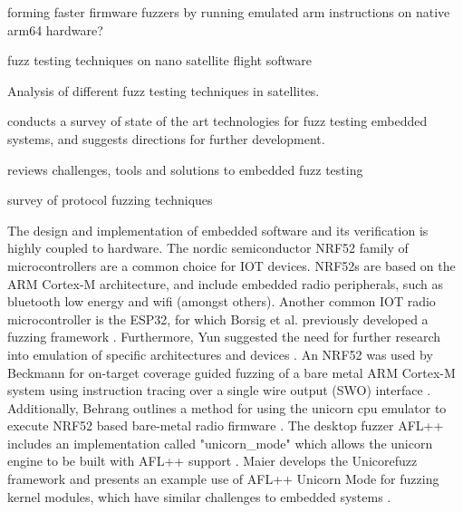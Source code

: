 \documentclass[../report.tex]{subfiles}
\begin{document}
\citet{Seidel_2023} forming faster firmware fuzzers by running emulated arm instructions on native arm64 hardware?


\citet{Gutierrez_2021} fuzz testing techniques on nano satellite flight software

\citet{Willbold_2024} Analysis of different fuzz testing techniques in satellites.



\citet{Yun_2022} conducts a survey of state of the art technologies for fuzz testing embedded systems, and suggests directions for further development.

\citet{Eisele_et_al_2022} reviews challenges, tools and solutions to embedded fuzz testing


\citet{Zhang_2024} survey of protocol fuzzing techniques




The design and implementation of embedded software and its verification is
highly coupled to hardware. The nordic semiconductor NRF52 family of
microcontrollers are a common choice for IOT devices. NRF52s are based on the
ARM Cortex-M architecture, and include embedded radio peripherals, such as
bluetooth low energy and wifi (amongst others). Another common IOT radio
microcontroller is the ESP32, for which Borsig et al. previously developed a
fuzzing framework \citep{Borsig_2020}. Furthermore, Yun suggested the need for
further research into emulation of specific architectures and devices
\citep{Yun_2022}. An NRF52 was used by Beckmann for on-target coverage guided
fuzzing of a bare metal ARM Cortex-M system using instruction tracing over a
single wire output (SWO) interface \citep{Beckmann_2023}. Additionally, Behrang
outlines a method for using the unicorn cpu emulator to execute NRF52 based
bare-metal radio firmware \citep{Behrang_2023}. The desktop fuzzer AFL++
includes an implementation called "unicorn\_mode" which allows the unicorn
engine to be built with AFL++ support \citep{UnicornMode}. Maier develops the
Unicorefuzz framework and presents an example use of AFL++ Unicorn Mode for
fuzzing kernel modules, which have similar challenges to embedded systems
\citep{Maier_2019}.
\end{document}
